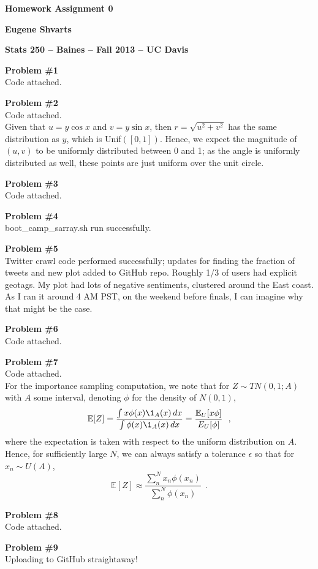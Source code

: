\documentclass[12pt,letterpaper]{article}
\def\E{\mathbb{E}}
\begin{document}
\hfill\textbf{\large Homework Assignment 0}

\hfill\textbf{Eugene Shvarts}

\hfill\textbf{ Stats 250 -- Baines -- Fall 2013 -- UC Davis}
\bigskip

\textbf{Problem \#1} \\ \textsf{Code attached.}
\bigskip

\textbf{Problem \#2} \\ \textsf{Code attached.} \\
Given that $u = y \cos x$ and $v = y \sin x$, then $r = \sqrt{u^2+v^2}$ has the same distribution as $y$, which is Unif$([0,1])$. Hence, we expect the magnitude of $(u,v)$ to be uniformly distributed between 0 and 1; as the angle is uniformly distributed as well, these points are just uniform over the unit circle.
\bigskip

\textbf{Problem \#3} \\ \textsf{Code attached.} 
\bigskip

\textbf{Problem \#4} \\ \textsf{boot\_camp\_sarray.sh} run successfully. 
\bigskip

\textbf{Problem \#5} \\ Twitter crawl code performed successfully; updates for finding the fraction of tweets and new plot added to GitHub repo. Roughly 1/3 of users had explicit geotags. My plot had lots of negative sentiments, clustered around the East coast. As I ran it around 4 AM PST, on the weekend before finals, I can imagine why that might be the case.
\bigskip

\textbf{Problem \#6} \\ \textsf{Code attached.} 
\bigskip

\textbf{Problem \#7} \\ \textsf{Code attached.} \\
For the importance sampling computation, we note that for $Z \sim TN(0,1;A)$ with $A$ some interval, denoting $\phi$ for the density of $N(0,1)$, 
$$
\mathbb{E}[Z] = \frac{\int x\phi(x) \1_A(x)\,dx}{\int \phi(x) \1_A(x)\,dx} = \frac{\E_U[x\phi]}{E_U[\phi]} ~~,
$$
where the expectation is taken with respect to the uniform distribution on $A$. Hence, for sufficiently large $N$, we can always satisfy a tolerance $\epsilon$ so that for $x_n \sim U(A)$, 
$$
\mathbb{E}[Z] \approx \dfrac{\sum_n^N x_n \phi(x_n)}{\sum_n^N \phi(x_n)}~~.
$$
\bigskip

\textbf{Problem \#8} \\  \textsf{Code attached.}
\bigskip

\textbf{Problem \#9} \\ Uploading to GitHub straightaway!



\pagebreak
%
\end{document}
